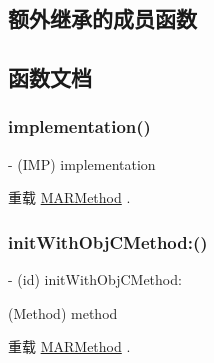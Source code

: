 \subsection*{额外继承的成员函数}


\subsection{函数文档}
\mbox{\label{interface_m_a_r_obj_c_method_af57e7f0e2f9a6fee8f2e5d3e279c8ab7}} 
\subsubsection{\texorpdfstring{implementation()}{implementation()}}
{\footnotesize\ttfamily -\/ (I\+MP) implementation \begin{DoxyParamCaption}{ }\end{DoxyParamCaption}\hspace{0.3cm}{\ttfamily [implementation]}}



重载 \hyperlink{interface_m_a_r_method_a64b5a4d139de5b478d368fa532f981c7}{M\+A\+R\+Method} .

\mbox{\label{interface_m_a_r_obj_c_method_aa5fcc429f5cec4d0b9af5276ffdac7fc}} 
\subsubsection{\texorpdfstring{init\+With\+Obj\+C\+Method\+:()}{initWithObjCMethod:()}}
{\footnotesize\ttfamily -\/ (id) init\+With\+Obj\+C\+Method\+: \begin{DoxyParamCaption}\item[{(Method)}]{method }\end{DoxyParamCaption}\hspace{0.3cm}{\ttfamily [implementation]}}



重载 \hyperlink{interface_m_a_r_method_ab44ba877c685d0c3fe43cacf2a573c92}{M\+A\+R\+Method} .

